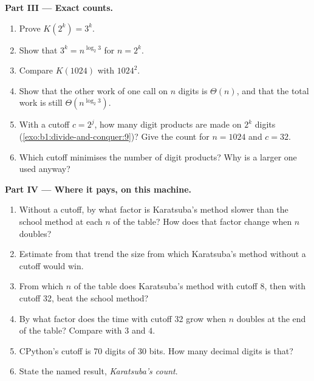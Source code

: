 \begin{problem}
\medskip\noindent\textbf{Part III --- Exact counts.}
\begin{enumerate}[resume]
\item Prove $K(2^k) = 3^k$.
\item Show that $3^k = n^{\log_2 3}$ for $n = 2^k$.
\item Compare $K(1024)$ with $1024^2$.
\item Show that the other work of one call on $n$ digits is $\Theta(n)$, and that the total work is still
$\Theta(n^{\log_2 3})$.
\item With a cutoff $c = 2^j$, how many digit products are made on $2^k$ digits (\cref{exo:b1:divide-and-conquer:9})?
Give the count for $n = 1024$ and $c = 32$.
\item Which cutoff minimises the number of digit products? Why is a larger one used anyway?
\end{enumerate}

\medskip\noindent\textbf{Part IV --- Where it pays, on this machine.}
\begin{enumerate}[resume]
\item Without a cutoff, by what factor is Karatsuba's method slower than the school method at each $n$ of the table?
How does that factor change when $n$ doubles?
\item Estimate from that trend the size from which Karatsuba's method without a cutoff would win.
\item From which $n$ of the table does Karatsuba's method with cutoff 8, then with cutoff 32, beat the school method?
\item By what factor does the time with cutoff 32 grow when $n$ doubles at the end of the table? Compare with $3$ and
$4$.
\item CPython's cutoff is 70 digits of 30 bits. How many decimal digits is that?
\item State the named result, \emph{Karatsuba's count}.
\end{enumerate}
\end{problem}
